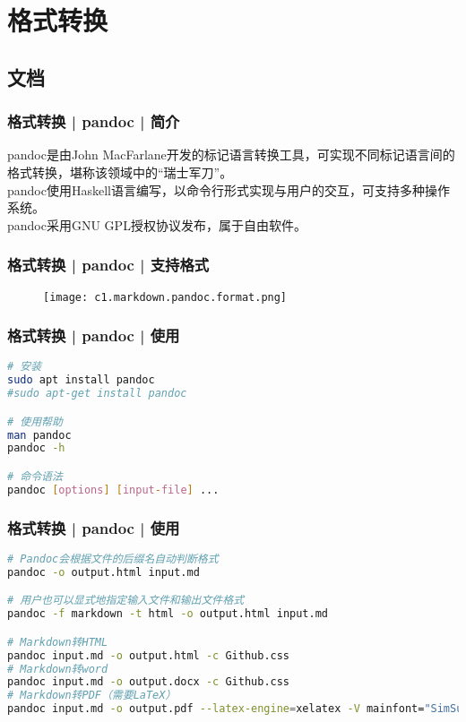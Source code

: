 \section{格式转换}
\subsection{文档}
\begin{frame}
  \frametitle{格式转换 | pandoc | 简介}
  pandoc是由John MacFarlane开发的标记语言转换工具，可实现不同标记语言间的格式转换，堪称该领域中的“瑞士军刀”。\\
  \vspace{1em}
  pandoc使用Haskell语言编写，以命令行形式实现与用户的交互，可支持多种操作系统。\\
  \vspace{1em}
  pandoc采用GNU GPL授权协议发布，属于自由软件。
\end{frame}

\begin{frame}
  \frametitle{格式转换 | pandoc | 支持格式}
  \begin{figure}
    \centering
    \texttt{[image: c1.markdown.pandoc.format.png]}
  \end{figure}
\end{frame}

\begin{frame}[fragile]
  \frametitle{格式转换 | pandoc | 使用}
\begin{lstlisting}[language=bash]
# 安装
sudo apt install pandoc
#sudo apt-get install pandoc

# 使用帮助
man pandoc
pandoc -h

# 命令语法
pandoc [options] [input-file] ...
\end{lstlisting}
\end{frame}

\begin{frame}[fragile]
  \frametitle{格式转换 | pandoc | \alert{使用}}
\begin{lstlisting}[language=bash]
# Pandoc会根据文件的后缀名自动判断格式
pandoc -o output.html input.md

# 用户也可以显式地指定输入文件和输出文件格式
pandoc -f markdown -t html -o output.html input.md

# Markdown转HTML
pandoc input.md -o output.html -c Github.css
# Markdown转word
pandoc input.md -o output.docx -c Github.css
# Markdown转PDF（需要LaTeX）
pandoc input.md -o output.pdf --latex-engine=xelatex -V mainfont="SimSun" --template=template.latex
\end{lstlisting}
\end{frame}


